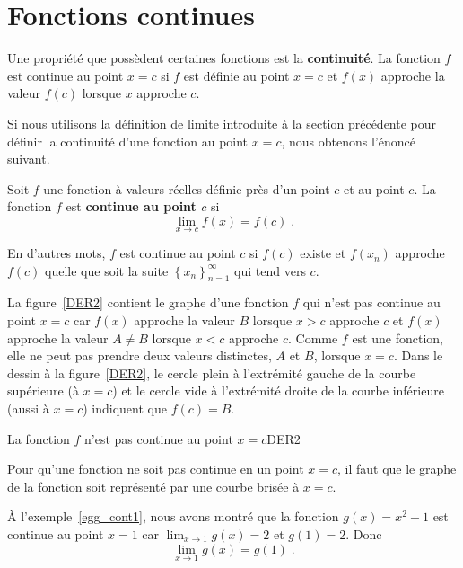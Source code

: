 {\section{Fonctions continues}

Une propriété que possèdent certaines fonctions est la
{\bfseries continuité}.  La fonction $f$ est continue au point $x=c$
si $f$ est définie au point $x=c$ et $f(x)$ approche la valeur $f(c)$
lorsque $x$ approche $c$.

Si nous utilisons la définition de limite introduite à la section
précédente pour définir la continuité d'une fonction au point $x=c$,
nous obtenons l'énoncé suivant.

\begin{defn} 
Soit $f$ une fonction à valeurs réelles définie près d'un point $c$ et
au point $c$.  La fonction $f$ est {\bfseries continue au point $c$}
si
\[
\lim_{x\rightarrow c} f(x) = f(c)  \; .
\]
\end{defn}

En d'autres mots, $f$ est continue au point $c$ si $f(c)$ existe et
$f(x_n)$ approche $f(c)$ quelle que soit la suite
$\displaystyle \left\{x_n\right\}_{n=1}^\infty$ qui tend vers $c$.

La figure~\ref{DER2} contient le graphe d'une fonction $f$ qui
n'est pas continue au point $x=c$ car $f(x)$ approche la valeur $B$
lorsque $x>c$ approche $c$ et $f(x)$ approche la valeur $A\neq B$
lorsque $x<c$ approche $c$.  Comme $f$ est une fonction, elle ne peut
pas prendre deux valeurs distinctes, $A$ et $B$, lorsque $x=c$.  Dans
le dessin à la figure~\ref{DER2}, le cercle plein à l'extrémité gauche de la
courbe supérieure (à $x=c$) et le cercle vide à l'extrémité droite de
la courbe inférieure (aussi à $x=c$) indiquent que $f(c)=B$.

{La fonction $f$ n'est pas continue au point $x=c$}{DER2}

Pour qu'une fonction ne soit pas continue en un point $x=c$, il faut
que le graphe de la fonction soit représenté par une courbe brisée à
$x=c$.

\begin{egg}
À l'exemple~\ref{egg_cont1}, nous avons montré que la fonction
$g(x) = x^2+1$ est continue au point $x=1$ car
$\displaystyle \lim_{x\rightarrow 1} g(x) = 2$ et $g(1)=2$. 
Donc
\[
\displaystyle \lim_{x\rightarrow 1} g(x) = g(1) \; .
\]
\end{egg}

}
